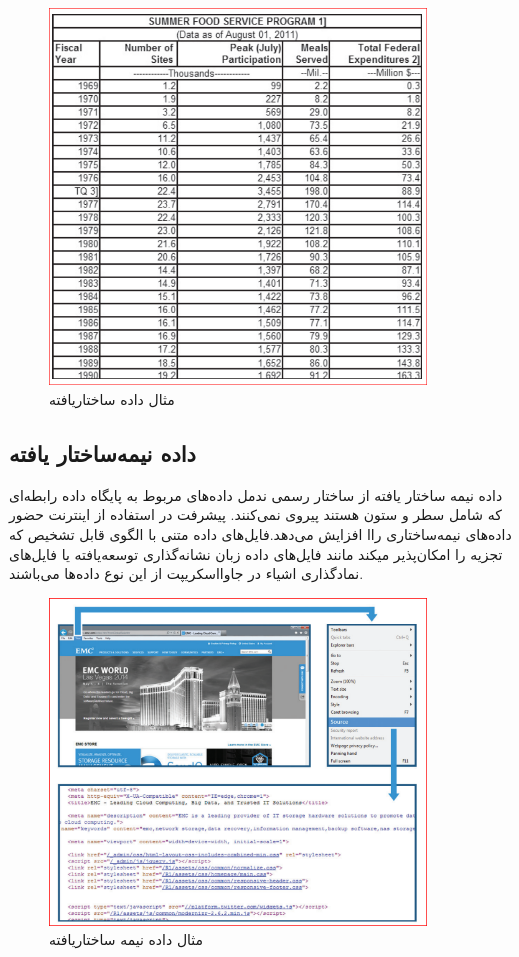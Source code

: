 \cite{verma2020}


\begin{figure}[htbp]
	\centering
	\includegraphics[width=10cm]{exp_structured_data.png}
	\caption{مثال داده ساختاریافته}
\end{figure}

\subsection{داده نیمه‌ساختار یافته}
داده نیمه ساختار یافته
از ساختار رسمی ندمل داده‌های مربوط به پایگاه داده رابطه‌ای که شامل سطر و ستون هستند پیروی نمی‌کنند. پیشرفت در استفاده از اینترنت حضور داده‌های نیمه‌ساختاری راا افزایش می‌دهد.فایل‌های داده متنی با الگوی قابل تشخیص که تجزیه را امکان‌پذیر میکند مانند فایل‌های داده زبان نشانه‌گذاری توسعه‌یافته
یا فایل‌های نمادگذاری اشیاء در جاوا‌اسکریپت
از این نوع داده‌ها می‌باشند.
\begin{figure}[htbp]
	\centering
	\includegraphics[width=10cm]{exp_semistructured.png}
	\caption{مثال داده نیمه ساختاریافته}
\end{figure}

